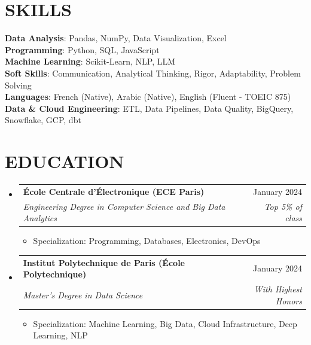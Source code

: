 \documentclass[11pt,a4paper]{article}
\makeatletter
\newcommand{\resumeItem}[1]{
  \item\footnotesize{
    {#1 \vspace{-1pt}}
  }
}
\newcommand{\resumeSubheading}[4]{
  \vspace{2pt}\item
    \begin{tabular*}{\textwidth}[t]{l@{\extracolsep{\fill}}r}
      {\footnotesize\textbf{#1}} & {\footnotesize#2} \\
      {\footnotesize\textit{#3}} & {\footnotesize\textit{#4}} \\
    \end{tabular*}\vspace{2pt}
}
\newcommand{\resumeSubHeadingListStart}{\begin{itemize}[leftmargin=0in, label={}]}
\newcommand{\resumeSubHeadingListEnd}{\end{itemize}}
\newcommand{\resumeItemListStart}{\begin{itemize}[label={\textbullet}]}
\newcommand{\resumeItemListEnd}{\end{itemize}\vspace{0pt}}
\makeatother
\begin{document}
\section{SKILLS}
\begin{itemize}[leftmargin=0in, label={}]
\footnotesize{\item{
{\footnotesize\textbf{Data Analysis}:} {\footnotesize Pandas, NumPy, Data Visualization, Excel} \\
\vspace{3pt}
{\footnotesize\textbf{Programming}:} {\footnotesize Python, SQL, JavaScript} \\
\vspace{3pt}
{\footnotesize\textbf{Machine Learning}:} {\footnotesize Scikit-Learn, NLP, LLM} \\
\vspace{3pt}
{\footnotesize\textbf{Soft Skills}:} {\footnotesize Communication, Analytical Thinking, Rigor, Adaptability, Problem Solving} \\
\vspace{3pt}
{\footnotesize\textbf{Languages}:} {\footnotesize French (Native), Arabic (Native), English (Fluent - TOEIC 875)} \\
\vspace{3pt}
{\footnotesize\textbf{Data \& Cloud Engineering}:} {\footnotesize ETL, Data Pipelines, Data Quality, BigQuery, Snowflake, GCP, dbt}
}
}
\end{itemize}

\section{EDUCATION}
\resumeSubHeadingListStart
    \resumeSubheading
      {École Centrale d'Électronique (ECE Paris)}
      {January 2024}
      {Engineering Degree in Computer Science and Big Data Analytics}
      {Top 5\% of class}
      \resumeItemListStart
        \resumeItem{Specialization: Programming, Databases, Electronics, DevOps}
      \resumeItemListEnd
    \resumeSubheading
      {Institut Polytechnique de Paris (École Polytechnique)}
      {January 2024}
      {Master's Degree in Data Science}
      {With Highest Honors}
      \resumeItemListStart
        \resumeItem{Specialization: Machine Learning, Big Data, Cloud Infrastructure, Deep Learning, NLP}
      \resumeItemListEnd
  \resumeSubHeadingListEnd
\end{document}
